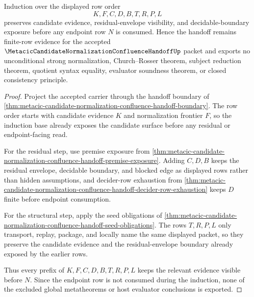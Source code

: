 \begin{theorem}
\label{thm:metacic-candidate-normalization-handoff-induction}
Induction over the displayed row order
$$
K,F,C,D,B,T,R,P,L
$$
preserves candidate evidence, residual-envelope visibility, and decidable-boundary exposure before any endpoint row $N$ is consumed. Hence the handoff remains finite-row evidence for the accepted $\MetacicCandidateNormalizationConfluenceHandoffUp$ packet and exports no unconditional strong normalization, Church--Rosser theorem, subject reduction theorem, quotient syntax equality, evaluator soundness theorem, or closed consistency principle.
\end{theorem}
\begin{proof}
Project the accepted carrier through the handoff boundary of \autoref{thm:metacic-candidate-normalization-confluence-handoff-boundary}. The row order starts with candidate evidence $K$ and normalization frontier $F$, so the induction base already exposes the candidate surface before any residual or endpoint-facing read.

For the residual step, use premise exposure from \autoref{thm:metacic-candidate-normalization-confluence-handoff-premise-exposure}. Adding $C,D,B$ keeps the residual envelope, decidable boundary, and blocked edge as displayed rows rather than hidden assumptions, and decider-row exhaustion from \autoref{thm:metacic-candidate-normalization-confluence-handoff-decider-row-exhaustion} keeps $D$ finite before endpoint consumption.

For the structural step, apply the seed obligations of \autoref{thm:metacic-candidate-normalization-confluence-handoff-seed-obligations}. The rows $T,R,P,L$ only transport, replay, package, and locally name the same displayed packet, so they preserve the candidate evidence and the residual-envelope boundary already exposed by the earlier rows.

Thus every prefix of $K,F,C,D,B,T,R,P,L$ keeps the relevant evidence visible before $N$. Since the endpoint row is not consumed during the induction, none of the excluded global metatheorems or host evaluator conclusions is exported.
\end{proof}

